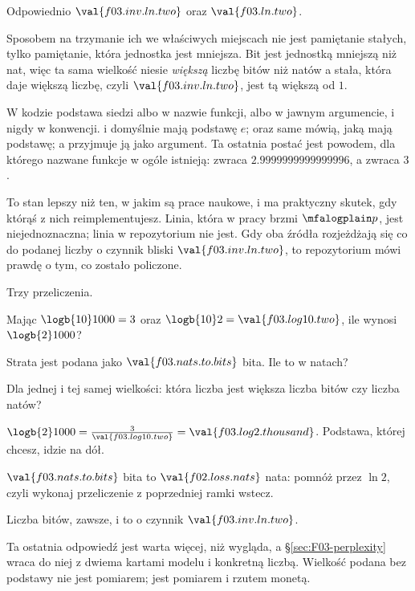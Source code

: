 \begin{fr}
\begin{ansblock}
Odpowiednio $\val{f03.inv.ln.two}$ oraz $\val{f03.ln.two}$.

Sposobem na trzymanie ich we właściwych miejscach nie jest pamiętanie stałych,
tylko pamiętanie, która jednostka jest mniejsza. Bit jest jednostką mniejszą
niż nat, więc ta sama wielkość niesie \emph{większą} liczbę bitów niż natów
\dash{} a stała, która daje większą liczbę, czyli $\val{f03.inv.ln.two}$, jest
tą większą od $1$.
\end{ansblock}

\begin{aibox}
W kodzie podstawa siedzi albo w nazwie funkcji, albo w jawnym argumencie, i
nigdy w konwencji.  i  domyślnie mają podstawę $e$;
 oraz  same mówią, jaką mają podstawę; a
 przyjmuje ją jako argument. Ta ostatnia postać jest
powodem, dla którego nazwane funkcje w ogóle istnieją: 
zwraca $\num{2.9999999999999996}$, a  zwraca $3$.

To stan lepszy niż ten, w jakim są prace naukowe, i ma praktyczny skutek, gdy
którąś z nich reimplementujesz. Linia, która w pracy brzmi $\mfalogplain p$,
jest niejednoznaczna; linia  w repozytorium nie jest. Gdy oba
źródła rozjeżdżają się co do podanej liczby o czynnik bliski
$\val{f03.inv.ln.two}$, to repozytorium mówi prawdę o tym, co zostało
policzone.
\end{aibox}

\yourturn
Trzy przeliczenia.

Mając $\logb{10} 1000 = 3$ oraz $\logb{10} 2 = \val{f03.log10.two}$, ile wynosi
$\logb{2} 1000$?

Strata jest podana jako $\val{f03.nats.to.bits}$ bita. Ile to w natach?

Dla jednej i tej samej wielkości: która liczba jest większa \dash{} liczba
bitów czy liczba natów?
\dotline
\nextframe
\end{fr}

\begin{fr}
\begin{ansblock}
$\logb{2} 1000 = \frac{3}{\val{f03.log10.two}} = \val{f03.log2.thousand}$.
Podstawa, której chcesz, idzie na dół.

$\val{f03.nats.to.bits}$ bita to $\val{f02.loss.nats}$ nata: pomnóż przez
$\ln 2$, czyli wykonaj przeliczenie z poprzedniej ramki wstecz.

Liczba bitów, zawsze, i to o czynnik $\val{f03.inv.ln.two}$.
\end{ansblock}

Ta ostatnia odpowiedź jest warta więcej, niż wygląda, a
\S\ref{sec:F03-perplexity} wraca do niej z dwiema kartami modelu i konkretną
liczbą. Wielkość podana bez podstawy nie jest pomiarem; jest pomiarem i
rzutem monetą.
\end{fr}


